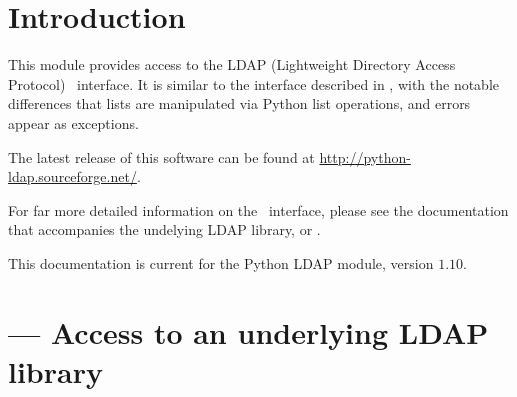 
\chapter{Introduction}

This module provides access to the LDAP
(Lightweight Directory Access Protocol) \C\ interface. 
It is similar to the interface described in ,
with the notable differences that lists are manipulated via Python
list operations, and errors appear as exceptions.

The latest release of this software can be found at
\url{http://python-ldap.sourceforge.net/}.

For far more detailed information on the \C\ interface, 
please see the documentation that accompanies the undelying
LDAP \C library, or .

This documentation is current for the Python LDAP module, version
$1.10$.

\chapter{ --- 
	Access to an underlying LDAP library}








